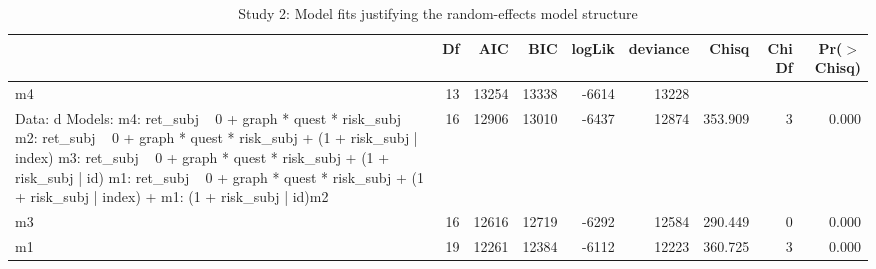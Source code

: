 \begin{table}[h!t]
\centering
\caption{Study 2: Model fits justifying the random-effects model structure} 
\begin{tabular}{lrrrrrrrr}
  \toprule
 & Df & AIC & BIC & logLik & deviance & Chisq & Chi Df & Pr($>$Chisq) \\ 
  \midrule
m4 & 13 & 13254 & 13338 & -6614 & 13228 &  &  &  \\ 
   Data: d Models: m4: ret_subj ~ 0 + graph * quest * risk_subj m2: ret_subj ~ 0 + graph * quest * risk_subj + (1 + risk_subj | index) m3: ret_subj ~ 0 + graph * quest * risk_subj + (1 + risk_subj | id) m1: ret_subj ~ 0 + graph * quest * risk_subj + (1 + risk_subj | index) +  m1:     (1 + risk_subj | id)m2 & 16 & 12906 & 13010 & -6437 & 12874 & 353.909 & 3 & 0.000 \\ 
  m3 & 16 & 12616 & 12719 & -6292 & 12584 & 290.449 & 0 & 0.000 \\ 
  m1 & 19 & 12261 & 12384 & -6112 & 12223 & 360.725 & 3 & 0.000 \\ 
   \bottomrule
\end{tabular}
\end{table}
